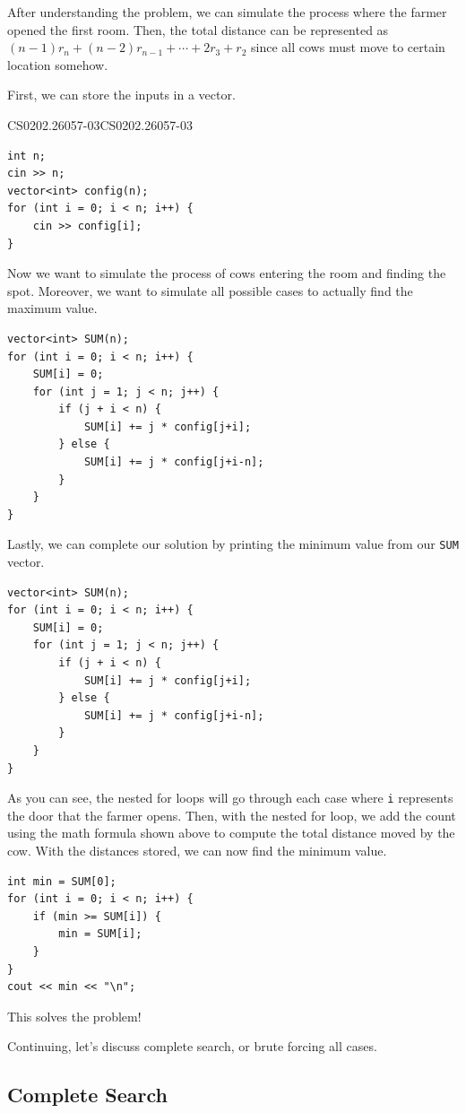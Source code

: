 \documentclass[../../../main.tex]{subfiles}
\begin{document}
\begin{solution}
After understanding the problem, we can simulate the process where
the farmer opened the first room. Then, the total distance can
be represented as $(n-1) r_n + (n-2) r_{n-1} + \cdots + 2 r_3 + r_2$
since all cows must move to certain location somehow.

First, we can store the inputs in a vector.

\begin{cppboxSolution}{CS0202.26057-03}{CS0202.26057-03}
\begin{lstlisting}[style=cppstyle]
int n;
cin >> n;
vector<int> config(n);
for (int i = 0; i < n; i++) {
    cin >> config[i];
}
\end{lstlisting}
\end{cppboxSolution}

Now we want to simulate the process of cows entering the room
and finding the spot. Moreover, we want to simulate all possible
cases to actually find the maximum value.

\begin{basicboxSolution}
\begin{lstlisting}[style=cppstyle]
vector<int> SUM(n);
for (int i = 0; i < n; i++) {
    SUM[i] = 0;
    for (int j = 1; j < n; j++) {
        if (j + i < n) {
            SUM[i] += j * config[j+i];
        } else {
            SUM[i] += j * config[j+i-n];
        }
    }
}
\end{lstlisting}
\end{basicboxSolution}

Lastly, we can complete our solution by printing the minimum
value from our \verb|SUM| vector.

\begin{basicboxSolution}
\begin{lstlisting}[style=cppstyle]
vector<int> SUM(n);
for (int i = 0; i < n; i++) {
    SUM[i] = 0;
    for (int j = 1; j < n; j++) {
        if (j + i < n) {
            SUM[i] += j * config[j+i];
        } else {
            SUM[i] += j * config[j+i-n];
        }
    }
}
\end{lstlisting}
\end{basicboxSolution}

As you can see, the nested for loops will go through each case
where \verb|i| represents the door that the farmer opens.
Then, with the nested for loop, we add the count using the
math formula shown above to compute the total distance moved
by the cow. With the distances stored, we can now find the
minimum value.

\begin{basicboxSolution}
\begin{lstlisting}[style=cppstyle]
int min = SUM[0];
for (int i = 0; i < n; i++) {
    if (min >= SUM[i]) {
        min = SUM[i];
    }
}
cout << min << "\n";
\end{lstlisting}
\end{basicboxSolution}

This solves the problem!
\end{solution}

Continuing, let's discuss complete search, or brute forcing all cases.

\subsection{Complete Search}
\end{document}
